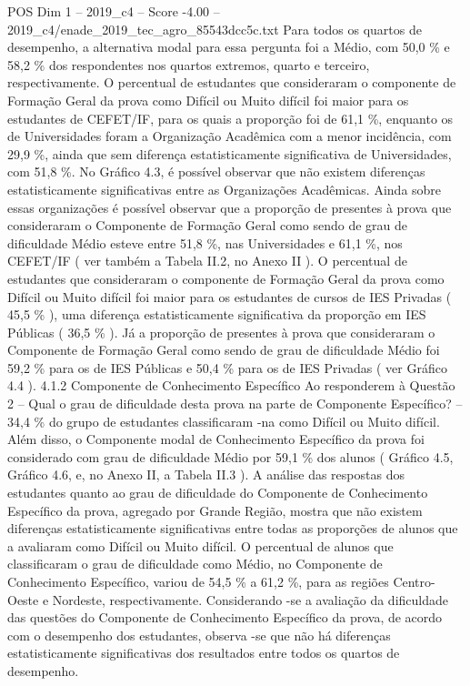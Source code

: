 \begin{textsample}{POS Dim 1 – 2019\_c4 – Score -4.00 – 2019\_c4/enade\_2019\_tec\_agro\_85543dcc5c.txt}
Para todos os quartos de desempenho, a alternativa modal para essa pergunta foi a Médio, com 50,0 \% e 58,2 \% dos respondentes nos quartos extremos, quarto e terceiro, respectivamente.
O percentual de estudantes que consideraram o componente de Formação Geral da prova como Difícil ou Muito difícil foi maior para os estudantes de CEFET/IF, para os quais a proporção foi de 61,1 \%, enquanto os de Universidades foram a Organização Acadêmica com a menor incidência, com 29,9 \%, ainda que sem diferença estatisticamente significativa de Universidades, com 51,8 \%.
No Gráfico 4.3, é possível observar que não existem diferenças estatisticamente significativas entre as Organizações Acadêmicas.
Ainda sobre essas organizações é possível observar que a proporção de presentes à prova que consideraram o Componente de Formação Geral como sendo de grau de dificuldade Médio esteve entre 51,8 \%, nas Universidades e 61,1 \%, nos CEFET/IF ( ver também a Tabela II.2, no Anexo II ).
O percentual de estudantes que consideraram o componente de Formação Geral da prova como Difícil ou Muito difícil foi maior para os estudantes de cursos de IES Privadas ( 45,5 \% ), uma diferença estatisticamente significativa da proporção em IES Públicas ( 36,5 \% ).
Já a proporção de presentes à prova que consideraram o Componente de Formação Geral como sendo de grau de dificuldade Médio foi 59,2 \% para os de IES Públicas e 50,4 \% para os de IES Privadas ( ver Gráfico 4.4 ). 4.1.2 Componente de Conhecimento Específico Ao responderem à Questão 2 – Qual o grau de dificuldade desta prova na parte de Componente Específico? – 34,4 \% do grupo de estudantes classificaram -na como Difícil ou Muito difícil.
Além disso, o Componente modal de Conhecimento Específico da prova foi considerado com grau de dificuldade Médio por 59,1 \% dos alunos ( Gráfico 4.5, Gráfico 4.6, e, no Anexo II, a Tabela II.3 ).
A análise das respostas dos estudantes quanto ao grau de dificuldade do Componente de Conhecimento Específico da prova, agregado por Grande Região, mostra que não existem diferenças estatisticamente significativas entre todas as proporções de alunos que a avaliaram como Difícil ou Muito difícil.
O percentual de alunos que classificaram o grau de dificuldade como Médio, no Componente de Conhecimento Específico, variou de 54,5 \% a 61,2 \%, para as regiões Centro-Oeste e Nordeste, respectivamente.
Considerando -se a avaliação da dificuldade das questões do Componente de Conhecimento Específico da prova, de acordo com o desempenho dos estudantes, observa -se que não há diferenças estatisticamente significativas dos resultados entre todos os quartos de desempenho.

\end{textsample}
